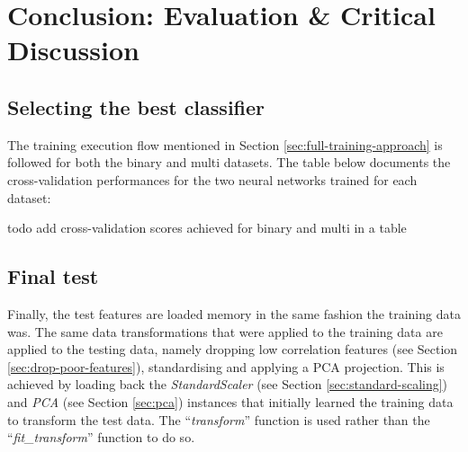 \documentclass[letterpaper,12pt]{article}
\begin{document}

\section{Conclusion: Evaluation \& Critical Discussion}
\label{sec:evaluation}

\subsection{Selecting the best classifier}

The training execution flow mentioned in Section \ref{sec:full-training-approach} is followed for both the binary and multi datasets. The table below documents the cross-validation performances for the two neural networks trained for each dataset:

todo add cross-validation scores achieved for binary and multi in a table



\subsection{Final test}

Finally, the test features are loaded memory in the same fashion the training data was. The same data transformations that were applied to the training data are applied to the testing data, namely dropping low correlation features (see Section \ref{sec:drop-poor-features}), standardising and applying a PCA projection. This is achieved by loading back the \textit{StandardScaler} (see Section \ref{sec:standard-scaling}) and \textit{PCA} (see Section \ref{sec:pca}) instances that initially learned the training data to transform the test data. The ``\textit{transform}'' function is used rather than the ``\textit{fit\_transform}'' function to do so.\\
\end{document}
